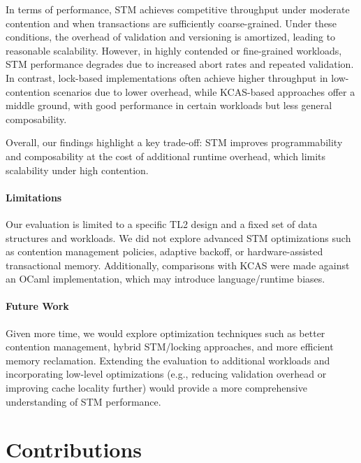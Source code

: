 \documentclass[11pt,a4paper]{article}
\begin{document}
In terms of performance, STM achieves competitive throughput under moderate contention and when transactions are sufficiently coarse-grained. Under these conditions, the overhead of validation and versioning is amortized, leading to reasonable scalability. However, in highly contended or fine-grained workloads, STM performance degrades due to increased abort rates and repeated validation. In contrast, lock-based implementations often achieve higher throughput in low-contention scenarios due to lower overhead, while KCAS-based approaches offer a middle ground, with good performance in certain workloads but less general composability.

Overall, our findings highlight a key trade-off: STM improves programmability and composability at the cost of additional runtime overhead, which limits scalability under high contention.

\paragraph{Limitations}
Our evaluation is limited to a specific TL2 design and a fixed set of data structures and workloads. We did not explore advanced STM optimizations such as contention management policies, adaptive backoff, or hardware-assisted transactional memory. Additionally, comparisons with KCAS were made against an OCaml implementation, which may introduce language/runtime biases.

\paragraph{Future Work}
Given more time, we would explore optimization techniques such as better contention management, hybrid STM/locking approaches, and more efficient memory reclamation. Extending the evaluation to additional workloads and incorporating low-level optimizations (e.g., reducing validation overhead or improving cache locality further) would provide a more comprehensive understanding of STM performance.

\section*{Contributions}
\label{sec:contributions}

\end{document}
